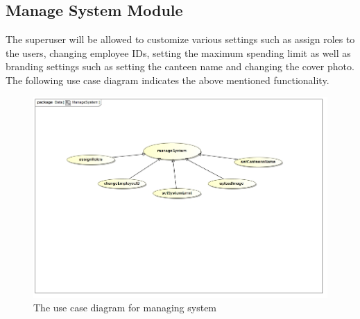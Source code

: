 \documentclass[a4paper,12pt]{report}
\begin{document}
\subsection{Manage System Module}

 The superuser will be allowed to customize various settings such as assign roles to the users, changing employee IDs, setting the maximum spending limit as well as branding settings such as setting the canteen name and changing the cover photo. The following use case diagram indicates the above mentioned functionality.

\begin{figure}[H]
  \centering
    \includegraphics[width=1.0\textwidth]{../images/ManageSystem.jpg}
    \caption{The use case diagram for managing system} 
\end{figure}
\end{document}
